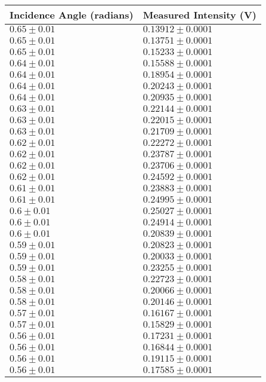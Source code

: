 \begin{tabular}{| p{} | p{} |}
\hline
Incidence Angle (radians) & Measured Intensity (V)\\
\hline
$0.65 \pm 0.01$ & $0.13912 \pm 0.0001$\\
$0.65 \pm 0.01$ & $0.13751 \pm 0.0001$\\
$0.65 \pm 0.01$ & $0.15233 \pm 0.0001$\\
$0.64 \pm 0.01$ & $0.15588 \pm 0.0001$\\
$0.64 \pm 0.01$ & $0.18954 \pm 0.0001$\\
$0.64 \pm 0.01$ & $0.20243 \pm 0.0001$\\
$0.64 \pm 0.01$ & $0.20935 \pm 0.0001$\\
$0.63 \pm 0.01$ & $0.22144 \pm 0.0001$\\
$0.63 \pm 0.01$ & $0.22015 \pm 0.0001$\\
$0.63 \pm 0.01$ & $0.21709 \pm 0.0001$\\
$0.62 \pm 0.01$ & $0.22272 \pm 0.0001$\\
$0.62 \pm 0.01$ & $0.23787 \pm 0.0001$\\
$0.62 \pm 0.01$ & $0.23706 \pm 0.0001$\\
$0.62 \pm 0.01$ & $0.24592 \pm 0.0001$\\
$0.61 \pm 0.01$ & $0.23883 \pm 0.0001$\\
$0.61 \pm 0.01$ & $0.24995 \pm 0.0001$\\
$0.6 \pm 0.01$ & $0.25027 \pm 0.0001$\\
$0.6 \pm 0.01$ & $0.24914 \pm 0.0001$\\
$0.6 \pm 0.01$ & $0.20839 \pm 0.0001$\\
$0.59 \pm 0.01$ & $0.20823 \pm 0.0001$\\
$0.59 \pm 0.01$ & $0.20033 \pm 0.0001$\\
$0.59 \pm 0.01$ & $0.23255 \pm 0.0001$\\
$0.58 \pm 0.01$ & $0.22723 \pm 0.0001$\\
$0.58 \pm 0.01$ & $0.20066 \pm 0.0001$\\
$0.58 \pm 0.01$ & $0.20146 \pm 0.0001$\\
$0.57 \pm 0.01$ & $0.16167 \pm 0.0001$\\
$0.57 \pm 0.01$ & $0.15829 \pm 0.0001$\\
$0.56 \pm 0.01$ & $0.17231 \pm 0.0001$\\
$0.56 \pm 0.01$ & $0.16844 \pm 0.0001$\\
$0.56 \pm 0.01$ & $0.19115 \pm 0.0001$\\
$0.56 \pm 0.01$ & $0.17585 \pm 0.0001$\\
\hline
\end{tabular}\hfill
